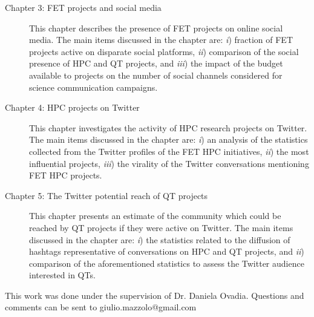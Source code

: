 \begin{description}
 \item[Chapter 3: FET projects and social media] This chapter describes the presence of FET projects on online social media. The main items discussed in the chapter are: \emph{i}) fraction of FET projects active on disparate social platforms, \emph{ii}) comparison of the social presence of HPC and QT projects, and \emph{iii}) the impact of the budget available to projects on the number of social channels considered for science communication campaigns.

 \item[Chapter 4: HPC projects on Twitter] This chapter investigates the activity of HPC research projects on Twitter. The main items discussed in the chapter are: \emph{i}) an analysis of the statistics collected from the Twitter profiles of the FET HPC initiatives, \emph{ii}) the most influential projects, \emph{iii}) the virality of the Twitter conversations mentioning FET HPC projects.

 \item[Chapter 5: The Twitter potential reach of QT projects] This chapter presents an estimate of the community which could be reached by QT projects if they were active on Twitter. The main items discussed in the chapter are: \emph{i}) the statistics related to the diffusion of hashtags representative of conversations on HPC and QT projects, and \emph{ii}) comparison of the aforementioned statistics to assess the Twitter audience interested in QTs.
\end{description}

\noindent
This work was done under the supervision of Dr. Daniela Ovadia. Questions and comments can be sent to giulio.mazzolo@gmail.com